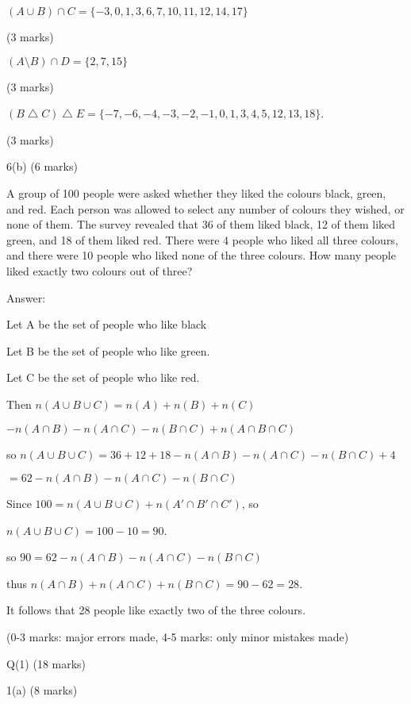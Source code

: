 \documentclass[a4paper,12pt,oneside]{book}
\theoremstyle{definition}
\begin{document}
$(A \cup B) \cap C = \{ -3, 0, 1, 3, 6, 7, 10, 11, 12, 14, 17 \}$

(3 marks)

$(A \setminus B) \cap D = \{ 2, 7, 15 \}$

(3 marks)

$(B \bigtriangleup C) \bigtriangleup E = \{-7, -6, -4, -3, -2, -1, 0, 1, 3, 4, 5, 12, 13, 18\}$.

(3 marks)

6(b) (6 marks)

A group of 100 people were asked whether they liked the colours black, green, and red. Each person was allowed to select any number of colours they wished, or none of them. The survey revealed that 36 of them liked black, 12 of them liked green, and 18 of them liked red. There were 4 people who liked all three colours, and there were 10 people who liked none of the three colours. How many people liked exactly two colours out of three?

Answer:

Let A be the set of people who like black

Let B be the set of people who like green.

Let C be the set of people who like red.

Then $n(A \cup B \cup C) = n(A)+n(B)+n(C)$

$-n(A \cap B)-n(A \cap C)-n(B \cap C)+n(A \cap B \cap C)$

so $n(A \cup B \cup C) = 36+12+18-n(A \cap B)-n(A \cap C)-n(B \cap C)+4$

$= 62-n(A \cap B)-n(A \cap C)-n(B \cap C)$

Since $100 = n(A \cup B \cup C)+n(A' \cap B' \cap C')$, so

$n(A \cup B \cup C) = 100-10 = 90$.

so $90=62-n(A \cap B)-n(A \cap C)-n(B \cap C)$

thus $n(A \cap B)+n(A \cap C)+n(B \cap C)=90-62=28$.

It follows that 28 people like exactly two of the three colours.

(0-3 marks: major errors made, 4-5 marks: only minor mistakes made)











\newpage

Q(1) (18 marks)

1(a) (8 marks)
\end{document}
